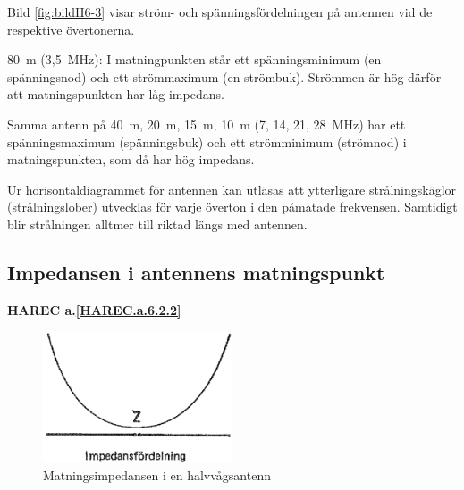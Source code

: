 Bild \ref{fig:bildII6-3} visar ström- och spänningsfördelningen på antennen vid de
respektive övertonerna.

80~m (3,5~MHz): I matningpunkten står ett spänningsminimum (en
spänningsnod) och ett strömmaximum (en strömbuk). Strömmen är hög
därför att matningspunkten har låg impedans.

Samma antenn på 40~m, 20~m, 15~m, 10~m (7, 14, 21, 28~MHz) har ett
spänningsmaximum (spänningsbuk) och ett strömminimum (strömnod) i
matningspunkten, som då har hög impedans.

Ur horisontaldiagrammet för antennen kan utläsas att ytterligare
strålningskäglor (strålningslober) utvecklas för varje överton i den
påmatade frekvensen. Samtidigt blir strålningen alltmer till riktad
längs med antennen.

\subsection{Impedansen i antennens matningspunkt}
\textbf{
HAREC a.\ref{HAREC.a.6.2.2}\label{myHAREC.a.6.2.2}
}

\begin{figure}
  \includegraphics[width=0.5\textwidth]{images/cropped_pdfs/bild_2_6-02.pdf}
  \caption{Matningsimpedansen i en halvvågsantenn}
  \label{fig:bildII6-2}
\end{figure}

